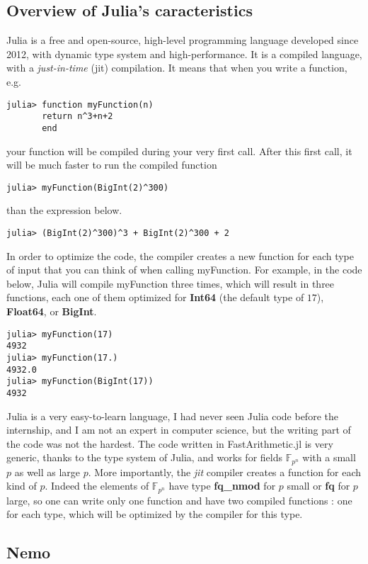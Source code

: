 \documentclass[a4paper,11pt]{article}
\theoremstyle{break}
\theoremstyle{definition}
\theoremstyle{remark}
\begin{document}
\subsection{Overview of Julia's caracteristics}
Julia is a free and open-source, high-level programming language developed since 2012, with dynamic
type system and high-performance. It is a compiled language, with a
\emph{just-in-time} (jit) compilation. It means that when you write a
function, e.g. 
\begin{verbatim}
julia> function myFunction(n)
       return n^3+n+2
       end
\end{verbatim}
your function will be compiled during your very first call. After this first
call, it will be much faster to run the compiled function
\begin{verbatim}
julia> myFunction(BigInt(2)^300)
\end{verbatim}
than the expression below.
\begin{verbatim}
julia> (BigInt(2)^300)^3 + BigInt(2)^300 + 2
\end{verbatim}
In order to optimize the code, the compiler creates a new function for each
type of input that you can think of when calling myFunction. For example, in the
code 
below, Julia will compile myFunction three times, which will result in
three functions, each one of them optimized for \textbf{Int64} (the default type
of $17$), \textbf{Float64}, or \textbf{BigInt}.
\begin{verbatim}
julia> myFunction(17)
4932
julia> myFunction(17.)
4932.0
julia> myFunction(BigInt(17))
4932
\end{verbatim}
Julia is a very easy-to-learn language, I had never seen Julia code before the 
internship, and I am not an expert in computer science, but the writing part of
the code was not the hardest. 
The code written in FastArithmetic.jl is
very generic, thanks to the type system of Julia, and works for fields
$\mathbb{F}_{p^n}$ with a small $p$ as well as large $p$. More importantly, the
\emph{jit} compiler creates a function for each kind of $p$. Indeed the elements
of $\mathbb{F}_{p^n}$ have type \textbf{fq\_nmod} for $p$ small or \textbf{fq}
for $p$ large, so one can write only one function and have two compiled
functions : one for each type, which will be optimized by the compiler for this type.

\subsection{Nemo}
\end{document}
